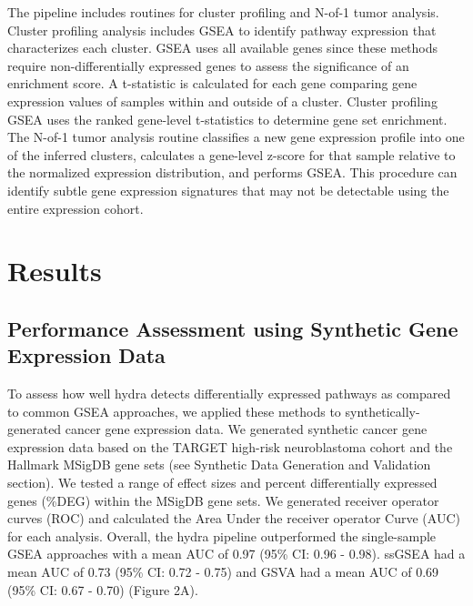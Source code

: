 \documentclass[10pt,letterpaper]{article}
\begin{document}
The pipeline includes routines for cluster profiling and N-of-1 tumor analysis. Cluster profiling analysis includes GSEA to identify pathway expression that characterizes each cluster. GSEA uses all available genes since these methods require non-differentially expressed genes to assess the significance of an enrichment score. A t-statistic is calculated for each gene comparing gene expression values of samples within and outside of a cluster. Cluster profiling GSEA uses the ranked gene-level t-statistics to determine gene set enrichment. The N-of-1 tumor analysis routine classifies a new gene expression profile into one of the inferred clusters, calculates a gene-level z-score for that sample relative to the normalized expression distribution, and performs GSEA. This procedure can identify subtle gene expression signatures that may not be detectable using the entire expression cohort.

\section*{Results}
\subsection{Performance Assessment using Synthetic Gene Expression Data}
To assess how well hydra detects differentially expressed pathways as compared to common GSEA approaches, we applied these methods to synthetically-generated cancer gene expression data. We generated synthetic cancer gene expression data based on the TARGET high-risk neuroblastoma cohort and the Hallmark MSigDB gene sets (see Synthetic Data Generation and Validation section). We tested a range of effect sizes and percent differentially expressed genes (\%DEG) within the MSigDB gene sets. We generated receiver operator curves (ROC) and calculated the Area Under the receiver operator Curve (AUC) for each analysis. Overall, the hydra pipeline outperformed the single-sample GSEA approaches with a mean AUC of 0.97 (95\% CI: 0.96 - 0.98). ssGSEA had a mean AUC of 0.73 (95\% CI: 0.72 - 0.75) and GSVA had a mean AUC of 0.69 (95\% CI: 0.67 - 0.70) (Figure 2A).
\end{document}

